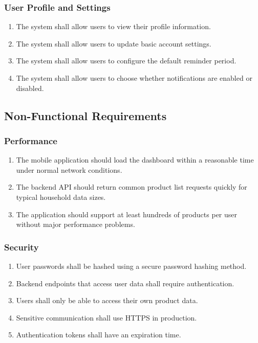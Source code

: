 \documentclass[12pt]{article}
\begin{document}
\subsubsection{User Profile and Settings}
\begin{enumerate}[label=FR-\arabic*. ,resume]
    \item The system shall allow users to view their profile information.
    \item The system shall allow users to update basic account settings.
    \item The system shall allow users to configure the default reminder period.
    \item The system shall allow users to choose whether notifications are enabled or disabled.
\end{enumerate}

\subsection{Non-Functional Requirements}

\subsubsection{Performance}
\begin{enumerate}[label=NFR-\arabic*.]
    \item The mobile application should load the dashboard within a reasonable time under normal network conditions.
    \item The backend API should return common product list requests quickly for typical household data sizes.
    \item The application should support at least hundreds of products per user without major performance problems.
\end{enumerate}

\subsubsection{Security}
\begin{enumerate}[label=NFR-\arabic*. ,resume]
    \item User passwords shall be hashed using a secure password hashing method.
    \item Backend endpoints that access user data shall require authentication.
    \item Users shall only be able to access their own product data.
    \item Sensitive communication shall use HTTPS in production.
    \item Authentication tokens shall have an expiration time.
\end{enumerate}
\end{document}
